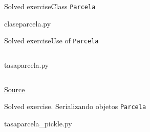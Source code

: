 \documentclass[10pt,compress]{beamer} %
\begin{document}
\begin{frame}{Solved exercise}{Class \texttt{Parcela}}
	\vspace{-0.26cm}
			\begin{block}{claseparcela.py}
			\vspace{-0.3cm} 
			\vspace{-0.3cm} 
			\end{block}
\end{frame}

\begin{frame}{Solved exercise}{Use of \texttt{Parcela}}
	\vspace{-0.4cm}
    \begin{columns}
			\begin{block}{tasaparcela.py}
			\vspace{-0.3cm} 
			\vspace{-0.3cm} 
			\end{block}
	\end{columns}
		\tiny{\href{http://esripress.esri.com/display/index.cfm?fuseaction=display&websiteID=276&moduleID=0}{Source}}
\end{frame}

\begin{frame}[plain]{Solved exercise. Serializando objetos \texttt{Parcela}}{}
			\begin{block}{\footnotesize{tasaparcela\_pickle.py}}
			\vspace{-0.2cm} 
			\vspace{-0.2cm} 
			\end{block}
	
\end{frame}
\end{document}
